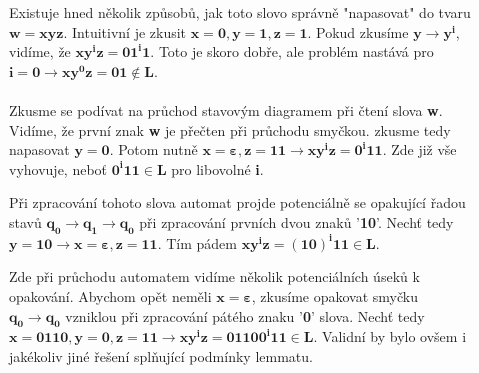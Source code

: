 \documentclass{report}
\begin{document}
    \begin{description}
        \item[] Existuje hned několik způsobů, jak toto slovo správně "napasovat" do tvaru $\mathbf{w = xyz}$. Intuitivní je zkusit $\mathbf{x=0,y=1,z=1}$. Pokud zkusíme $\mathbf{y \rightarrow y^i}$, vidíme, že $\mathbf{xy^{i}z=01^{i}1}$. Toto je skoro dobře, ale problém nastává pro $\mathbf{i=0 \rightarrow xy^{0}z=01 \notin L}$.\\ \\Zkusme se podívat na průchod stavovým diagramem při čtení slova \textbf{w}. Vidíme, že první znak \textbf{w} je přečten při průchodu smyčkou. zkusme tedy napasovat $\mathbf{y=0}$. Potom nutně $\mathbf{x=\varepsilon,z=11 \rightarrow xy^{i}z = 0^{i}11}$. Zde již vše vyhovuje, neboť $\mathbf{0^{i}11 \in L}$ pro libovolné \textbf{i}.
        \item[] Při zpracování tohoto slova automat projde potenciálně se opakující řadou stavů $\mathbf{q_0 \rightarrow q_1 \rightarrow q_0}$ při zpracování prvních dvou znaků '\textbf{10}'. Nechť tedy $\mathbf{y = 10 \rightarrow x = \varepsilon, z= 11}$. Tím pádem $\mathbf{xy^{i}z = (10)^i11 \in L}$.
        \item[] Zde při průchodu automatem vidíme několik potenciálních úseků k opakování. Abychom opět neměli $\mathbf{x=\varepsilon}$, zkusíme opakovat smyčku $\mathbf{q_0 \rightarrow q_0}$ vzniklou při zpracování pátého znaku '\textbf{0}' slova. Nechť tedy $\mathbf{x=0110, y=0,z=11 \rightarrow xy^iz=01100^i11 \in L}$. Validní by bylo ovšem i jakékoliv jiné řešení splňující podmínky lemmatu.
     \end{description}
    \pagebreak
\end{document}
